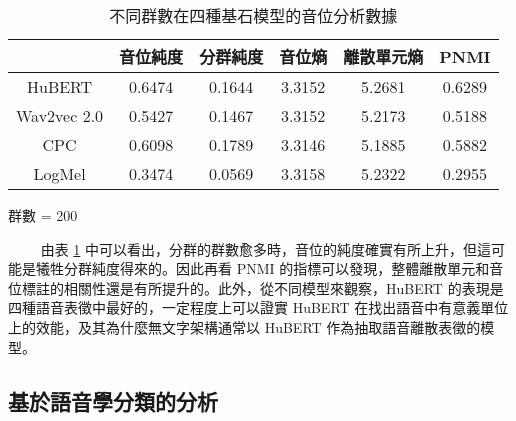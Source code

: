 \begin{table}[!htbp]
    \vspace{0.5cm}

    \begin{subtable}[t]{\textwidth}
        \centering
        \begin{tabular}{|c|c|c|c|c|c|} \hline
                        & 音位純度   & 分群純度   & 音位熵    & 離散單元熵  & PNMI   \\ \hline
            HuBERT      & 0.6474 & 0.1644 & 3.3152 & 5.2681 & 0.6289 \\ \hline    %
            Wav2vec 2.0 & 0.5427 & 0.1467 & 3.3152 & 5.2173 & 0.5188 \\ \hline    %
            CPC         & 0.6098 & 0.1789 & 3.3146 & 5.1885 & 0.5882 \\ \hline    %
            LogMel      & 0.3474 & 0.0569 & 3.3158 & 5.2322 & 0.2955 \\ \hline    %
        \end{tabular}
        \caption{群數 = 200}
        \label{tab:ch3-clu200-phn}
    \end{subtable}

    \caption{不同群數在四種基石模型的音位分析數據}
    \label{tab:single-cluster-results}
\end{table}
　　
由表 \ref{tab:single-cluster-results} 中可以看出，分群的群數愈多時，音位的純度確實有所上升，但這可能是犧牲分群純度得來的。因此再看 PNMI 的指標可以發現，整體離散單元和音位標註的相關性還是有所提升的。此外，從不同模型來觀察，HuBERT 的表現是四種語音表徵中最好的，一定程度上可以證實 HuBERT 在找出語音中有意義單位上的效能，及其為什麼無文字架構通常以 HuBERT 作為抽取語音離散表徵的模型。

\subsection{基於語音學分類的分析}

